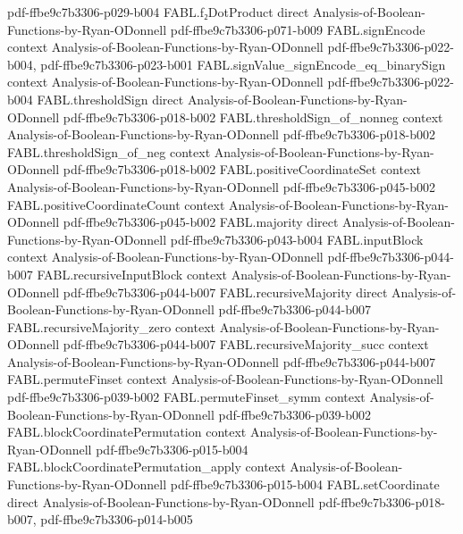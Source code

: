 \begin{theorem}
  {pdf-ffbe9c7b3306-p029-b004}
\proofstep
  {FABL.f₂DotProduct}
  {direct}
  {Analysis-of-Boolean-Functions-by-Ryan-ODonnell}
  {pdf-ffbe9c7b3306-p071-b009}
\proofstep
  {FABL.signEncode}
  {context}
  {Analysis-of-Boolean-Functions-by-Ryan-ODonnell}
  {pdf-ffbe9c7b3306-p022-b004,
    pdf-ffbe9c7b3306-p023-b001}
\proofstep
  {FABL.signValue_signEncode_eq_binarySign}
  {context}
  {Analysis-of-Boolean-Functions-by-Ryan-ODonnell}
  {pdf-ffbe9c7b3306-p022-b004}
\proofstep
  {FABL.thresholdSign}
  {direct}
  {Analysis-of-Boolean-Functions-by-Ryan-ODonnell}
  {pdf-ffbe9c7b3306-p018-b002}
\proofstep
  {FABL.thresholdSign_of_nonneg}
  {context}
  {Analysis-of-Boolean-Functions-by-Ryan-ODonnell}
  {pdf-ffbe9c7b3306-p018-b002}
\proofstep
  {FABL.thresholdSign_of_neg}
  {context}
  {Analysis-of-Boolean-Functions-by-Ryan-ODonnell}
  {pdf-ffbe9c7b3306-p018-b002}
\proofstep
  {FABL.positiveCoordinateSet}
  {context}
  {Analysis-of-Boolean-Functions-by-Ryan-ODonnell}
  {pdf-ffbe9c7b3306-p045-b002}
\proofstep
  {FABL.positiveCoordinateCount}
  {context}
  {Analysis-of-Boolean-Functions-by-Ryan-ODonnell}
  {pdf-ffbe9c7b3306-p045-b002}
\proofstep
  {FABL.majority}
  {direct}
  {Analysis-of-Boolean-Functions-by-Ryan-ODonnell}
  {pdf-ffbe9c7b3306-p043-b004}
\proofstep
  {FABL.inputBlock}
  {context}
  {Analysis-of-Boolean-Functions-by-Ryan-ODonnell}
  {pdf-ffbe9c7b3306-p044-b007}
\proofstep
  {FABL.recursiveInputBlock}
  {context}
  {Analysis-of-Boolean-Functions-by-Ryan-ODonnell}
  {pdf-ffbe9c7b3306-p044-b007}
\proofstep
  {FABL.recursiveMajority}
  {direct}
  {Analysis-of-Boolean-Functions-by-Ryan-ODonnell}
  {pdf-ffbe9c7b3306-p044-b007}
\proofstep
  {FABL.recursiveMajority_zero}
  {context}
  {Analysis-of-Boolean-Functions-by-Ryan-ODonnell}
  {pdf-ffbe9c7b3306-p044-b007}
\proofstep
  {FABL.recursiveMajority_succ}
  {context}
  {Analysis-of-Boolean-Functions-by-Ryan-ODonnell}
  {pdf-ffbe9c7b3306-p044-b007}
\proofstep
  {FABL.permuteFinset}
  {context}
  {Analysis-of-Boolean-Functions-by-Ryan-ODonnell}
  {pdf-ffbe9c7b3306-p039-b002}
\proofstep
  {FABL.permuteFinset_symm}
  {context}
  {Analysis-of-Boolean-Functions-by-Ryan-ODonnell}
  {pdf-ffbe9c7b3306-p039-b002}
\proofstep
  {FABL.blockCoordinatePermutation}
  {context}
  {Analysis-of-Boolean-Functions-by-Ryan-ODonnell}
  {pdf-ffbe9c7b3306-p015-b004}
\proofstep
  {FABL.blockCoordinatePermutation_apply}
  {context}
  {Analysis-of-Boolean-Functions-by-Ryan-ODonnell}
  {pdf-ffbe9c7b3306-p015-b004}
\proofstep
  {FABL.setCoordinate}
  {direct}
  {Analysis-of-Boolean-Functions-by-Ryan-ODonnell}
  {pdf-ffbe9c7b3306-p018-b007,
    pdf-ffbe9c7b3306-p014-b005}

\end{theorem}
